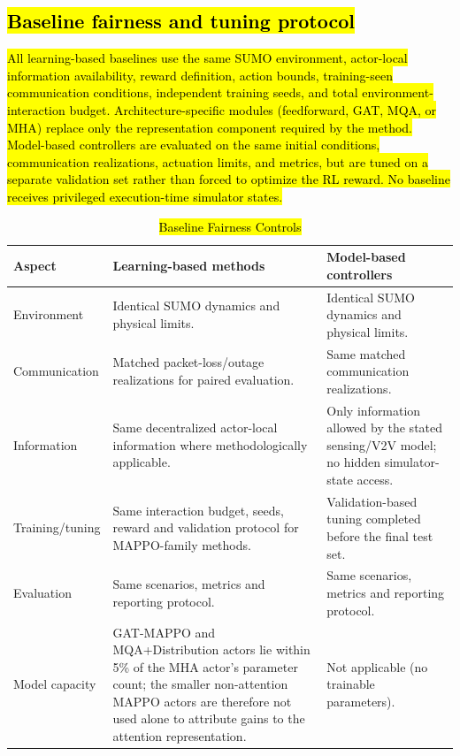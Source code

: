 \documentclass{ieeeaccess}
\begin{document}
\subsection{\hl{Baseline fairness and tuning protocol}}
\label{sec:baseline_fairness}

\hl{All learning-based baselines use the same SUMO environment, actor-local information availability, reward definition, action bounds, training-seen communication conditions, independent training seeds, and total environment-interaction budget. Architecture-specific modules (feedforward, GAT, MQA, or MHA) replace only the representation component required by the method. Model-based controllers are evaluated on the same initial conditions, communication realizations, actuation limits, and metrics, but are tuned on a separate validation set rather than forced to optimize the RL reward. No baseline receives privileged execution-time simulator states.}

\begin{table}[htbp]
\centering
\caption{\hl{Baseline Fairness Controls}}
\label{tab:baseline_fairness}
\renewcommand{\arraystretch}{1.12}
\begin{tabularx}{\textwidth}{|p{3.0cm}|X|X|}
\hline
\rowcolor{yellow}\textbf{Aspect} & \textbf{Learning-based methods} & \textbf{Model-based controllers} \\ \hline
\rowcolor{yellow}Environment & Identical SUMO dynamics and physical limits. & Identical SUMO dynamics and physical limits. \\ \hline
\rowcolor{yellow}Communication & Matched packet-loss/outage realizations for paired evaluation. & Same matched communication realizations. \\ \hline
\rowcolor{yellow}Information & Same decentralized actor-local information where methodologically applicable. & Only information allowed by the stated sensing/V2V model; no hidden simulator-state access. \\ \hline
\rowcolor{yellow}Training/tuning & Same interaction budget, seeds, reward and validation protocol for MAPPO-family methods. & Validation-based tuning completed before the final test set. \\ \hline
\rowcolor{yellow}Evaluation & Same scenarios, metrics and reporting protocol. & Same scenarios, metrics and reporting protocol. \\ \hline
\rowcolor{yellow}Model capacity & GAT-MAPPO and MQA+Distribution actors lie within 5\% of the MHA actor's parameter count; the smaller non-attention MAPPO actors are therefore not used alone to attribute gains to the attention representation. & Not applicable (no trainable parameters). \\ \hline
\end{tabularx}
\end{table}
\end{document}
